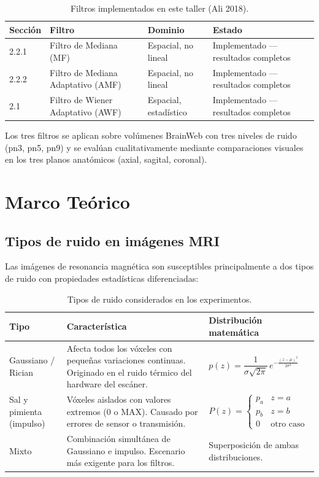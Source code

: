 \documentclass[12pt, a4paper]{article}
\begin{document}
\begin{table}[H]
\centering
\renewcommand{\arraystretch}{1.3}
\begin{tabularx}{\textwidth}{lllX}
\toprule
\textbf{Sección} & \textbf{Filtro} & \textbf{Dominio} & \textbf{Estado} \\
\midrule
2.2.1 & Filtro de Mediana (MF) & Espacial, no lineal & Implementado — resultados completos \\
2.2.2 & Filtro de Mediana Adaptativo (AMF) & Espacial, no lineal & Implementado — resultados completos \\
2.1   & Filtro de Wiener Adaptativo (AWF)  & Espacial, estadístico & Implementado — resultados completos \\
\bottomrule
\end{tabularx}
\caption{Filtros implementados en este taller (Ali 2018).}
\end{table}

Los tres filtros se aplican sobre volúmenes BrainWeb \cite{brainweb} con tres niveles de
ruido (pn3, pn5, pn9) y se evalúan cualitativamente mediante comparaciones visuales en
los tres planos anatómicos (axial, sagital, coronal).

\section{Marco Teórico}

\subsection{Tipos de ruido en imágenes MRI}

Las imágenes de resonancia magnética son susceptibles principalmente a dos tipos de
ruido con propiedades estadísticas diferenciadas:

\begin{table}[H]
\centering
\renewcommand{\arraystretch}{1.4}
\begin{tabularx}{\textwidth}{lXX}
\toprule
\textbf{Tipo} & \textbf{Característica} & \textbf{Distribución matemática} \\
\midrule
Gaussiano / Rician &
Afecta todos los vóxeles con pequeñas variaciones continuas. Originado en el ruido
térmico del hardware del escáner. &
$p(z) = \dfrac{1}{\sigma\sqrt{2\pi}}\, e^{-\frac{(z-\mu)^2}{2\sigma^2}}$ \\[1em]
Sal y pimienta (impulso) &
Vóxeles aislados con valores extremos (0 o MAX). Causado por errores de sensor o
transmisión. &
$P(z) = \begin{cases} p_a & z = a \\ p_b & z = b \\ 0 & \text{otro caso} \end{cases}$ \\[1em]
Mixto &
Combinación simultánea de Gaussiano e impulso. Escenario más exigente para los filtros. &
Superposición de ambas distribuciones. \\
\bottomrule
\end{tabularx}
\caption{Tipos de ruido considerados en los experimentos.}
\end{table}
\end{document}
